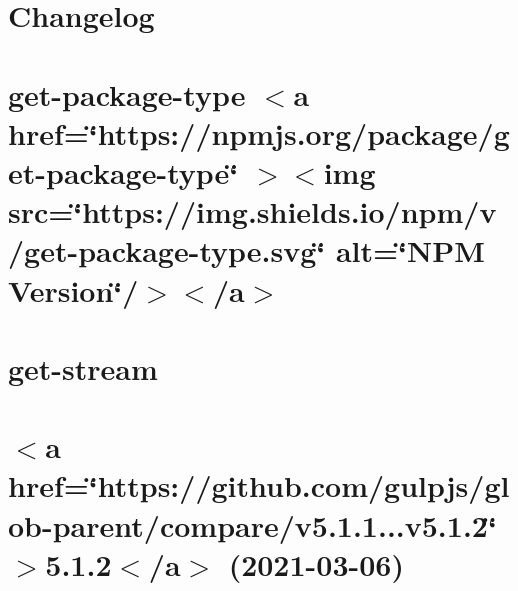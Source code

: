 \documentclass[twoside]{book}
\newcommand{\+}{\discretionary{\mbox{\scriptsize$\hookleftarrow$}}{}{}}
\begin{document}
\chapter{Changelog}
\label{md__c___users_vaishnavi_jadhav__desktop__developer_code_mean_stack_example_client_node_modules_g405be89bace7a4aad30788f2b306e9e6}

\chapter{get-\/package-\/type \texorpdfstring{$<$}{<}a href=\char`\"{}https\+://npmjs.\+org/package/get-\/package-\/type\char`\"{} \texorpdfstring{$>$}{>}\texorpdfstring{$<$}{<}img src=\char`\"{}https\+://img.\+shields.\+io/npm/v/get-\/package-\/type.\+svg\char`\"{} alt=\char`\"{}\+NPM Version\char`\"{}/\texorpdfstring{$>$}{>}\texorpdfstring{$<$}{<}/a\texorpdfstring{$>$}{>}}
\label{md__c___users_vaishnavi_jadhav__desktop__developer_code_mean_stack_example_client_node_modules_get_package_type__r_e_a_d_m_e}

\chapter{get-\/stream}
\label{md__c___users_vaishnavi_jadhav__desktop__developer_code_mean_stack_example_client_node_modules_get_stream_readme}

\chapter{\texorpdfstring{$<$}{<}a href=\char`\"{}https\+://github.\+com/gulpjs/glob-\/parent/compare/v5.\+1.\+1...\+v5.\+1.\+2\char`\"{} \texorpdfstring{$>$}{>}5.1.2\texorpdfstring{$<$}{<}/a\texorpdfstring{$>$}{>} (2021-\/03-\/06)}
\label{md__c___users_vaishnavi_jadhav__desktop__developer_code_mean_stack_example_client_node_modules_glob_parent__c_h_a_n_g_e_l_o_g}

\end{document}
